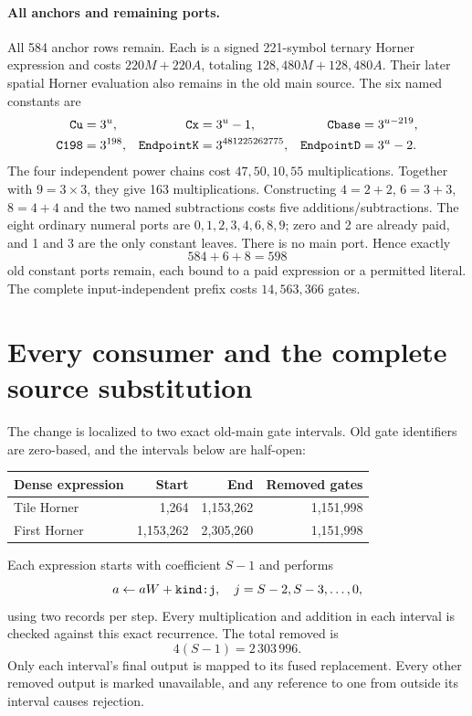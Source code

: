 \documentclass[11pt,letterpaper]{article}
\theoremstyle{definition}\newtheorem{definition}[theorem]{Definition}
\theoremstyle{remark}\newtheorem{remark}[theorem]{Remark}
\newcommand{\code}[1]{\texttt{\detokenize{#1}}}
\begin{document}
\paragraph{All anchors and remaining ports.}
All 584 anchor rows remain. Each is a signed 221-symbol ternary Horner expression and costs $220M+220A$, totaling $128,480M+128,480A$. Their later spatial Horner evaluation also remains in the old main source. The six named constants are
\begin{align*}
 \code{Cu}&=3^u,&\code{Cx}&=3^u-1,&\code{Cbase}&=3^{u-219},\\
 \code{C198}&=3^{198},&\code{EndpointK}&=3^{481225262775},&
 \code{EndpointD}&=3^u-2.
\end{align*}
The four independent power chains cost $47,50,10,55$ multiplications. Together with $9=3\times3$, they give 163 multiplications. Constructing $4=2+2$, $6=3+3$, $8=4+4$ and the two named subtractions costs five additions/subtractions. The eight ordinary numeral ports are $0,1,2,3,4,6,8,9$; zero and 2 are already paid, and 1 and 3 are the only constant leaves. There is no main \code{C:-1} port. Hence exactly
\[
 584+6+8=598
\]
old constant ports remain, each bound to a paid expression or a permitted literal. The complete input-independent prefix costs $14,563,366$ gates.

\section{Every consumer and the complete source substitution}\label{ptr:fu:sec:splice}
The change is localized to two exact old-main gate intervals. Old gate identifiers are zero-based, and the intervals below are half-open:
\begin{center}
\begin{tabular}{@{}lrrr@{}}\toprule
Dense expression&Start&End&Removed gates\\\midrule
Tile Horner&1,264&1,153,262&1,151,998\\
First Horner&1,153,262&2,305,260&1,151,998\\\bottomrule
\end{tabular}
\end{center}
Each expression starts with coefficient $S-1$ and performs
\[
 a\leftarrow aW+\code{kind:j},\quad j=S-2,S-3,\ldots,0,
\]
using two records per step. Every multiplication and addition in each interval is checked against this exact recurrence. The total removed is
\[
 4(S-1)=2\,303\,996.
\]
Only each interval's final output is mapped to its fused replacement. Every other removed output is marked unavailable, and any reference to one from outside its interval causes rejection.
\end{document}
